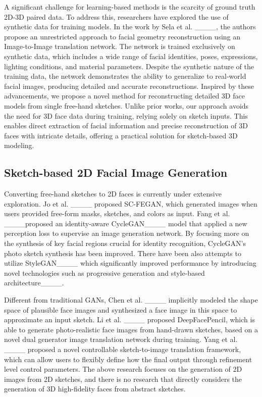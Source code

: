 A significant challenge for learning-based methods is the scarcity of ground truth 2D-3D paired data. To address this, researchers have explored the use of synthetic data for training models. In the work by Sela et al. ____, the authors propose an unrestricted approach to facial geometry reconstruction using an Image-to-Image translation network. The network is trained exclusively on synthetic data, which includes a wide range of facial identities, poses, expressions, lighting conditions, and material parameters. Despite the synthetic nature of the training data, the network demonstrates the ability to generalize to real-world facial images, producing detailed and accurate reconstructions. Inspired by these advancements, we propose a novel method for reconstructing detailed 3D face models from single free-hand sketches. Unlike prior works, our approach avoids the need for 3D face data during training, relying solely on sketch inputs. This enables direct extraction of facial information and precise reconstruction of 3D faces with intricate details, offering a practical solution for sketch-based 3D modeling.
\subsection{Sketch-based 2D Facial Image Generation} 
Converting free-hand sketches to 2D faces is currently under extensive exploration. Jo et al. ____ proposed SC-FEGAN, which generated images when users provided free-form masks, sketches, and colors as input. Fang et al. ____proposed an identity-aware CycleGAN____ model that applied a new perception loss to supervise an image generation network.
By focusing more on the synthesis of key facial regions crucial for identity recognition, CycleGAN's photo sketch synthesis has been improved. There have been also attempts to utilize StyleGAN____ which significantly improved performance by introducing novel technologies such as progressive generation and style-based architecture____. 

Different from traditional GANs, Chen et al. ____ implicitly modeled the shape space of plausible face images and synthesized a face image in this space to approximate an input sketch. Li et al. ____ proposed DeepFacePencil, which is able to generate photo-realistic face images from hand-drawn sketches, based on a novel dual generator image translation network during training. Yang et al. ____ proposed a novel controllable sketch-to-image translation framework, which can allow users to flexibly define how the final output through refinement level control parameters. The above research focuses on the generation of 2D images from 2D sketches, and there is no research that directly considers the generation of 3D high-fidelity faces from abstract sketches.

